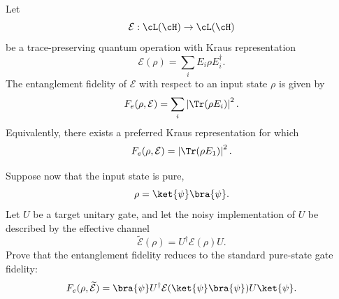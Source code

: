 Let
$$
\mathcal{E}:\cL(\cH)\to \cL(\cH)
$$
be a trace-preserving quantum operation with Kraus representation
$$
\mathcal{E}(\rho)=\sum_i E_i\rho E_i^\dagger.
$$
The entanglement fidelity of $\mathcal{E}$ with respect to an input state $\rho$ is given by
$$
F_e(\rho,\mathcal{E})
=
\sum_i
\left|
\Tr(\rho E_i)
\right|^2.
$$
Equivalently, there exists a preferred Kraus representation for which
$$
F_e(\rho,\mathcal{E})
=
\left|
\Tr(\rho E_1)
\right|^2.
$$

Suppose now that the input state is pure,
$$
\rho=\ket{\psi}\bra{\psi}.
$$
Let $U$ be a target unitary gate, and let the noisy implementation of $U$ be described by the effective channel
$$
\widetilde{\mathcal{E}}(\rho)
=
U^\dagger \mathcal{E}(\rho) U.
$$
Prove that the entanglement fidelity reduces to the standard pure-state gate fidelity:
$$
F_e(\rho,\widetilde{\mathcal{E}})
=
\bra{\psi}
U^\dagger
\mathcal{E}(\ket{\psi}\bra{\psi})
U
\ket{\psi}.
$$
